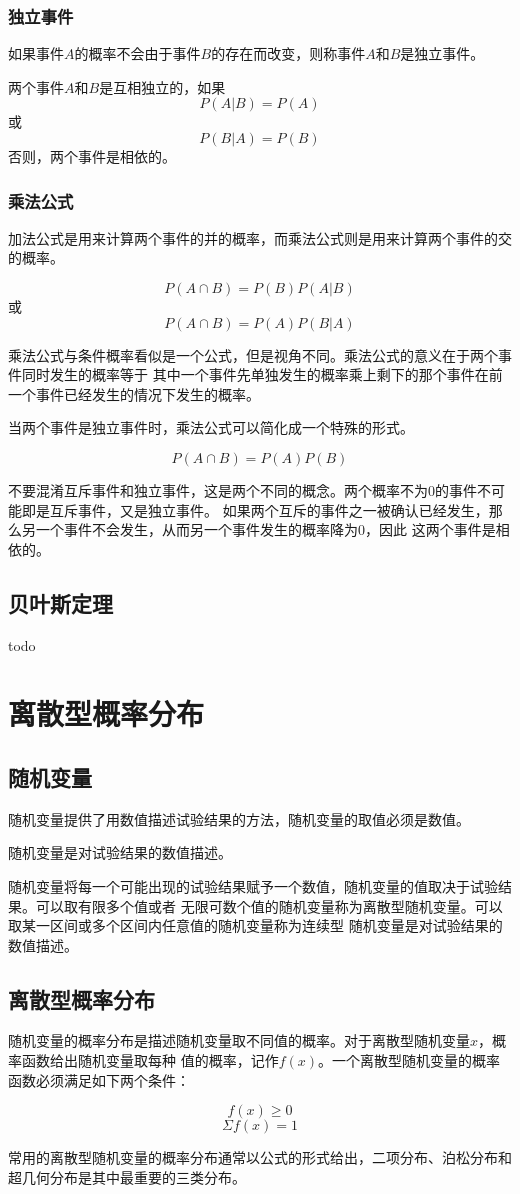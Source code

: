 \documentclass[a4paper]{ctexrep}
\begin{document}
\subsection{独立事件}
如果事件$A$的概率不会由于事件$B$的存在而改变，则称事件$A$和$B$是独立事件。
\begin{tcolorbox}[title = {独立事件}]
两个事件$A$和$B$是互相独立的，如果
\[P(A|B) = P(A)\]
或
\[P(B|A)=P(B)\]
否则，两个事件是相依的。
\end{tcolorbox}

\subsection{乘法公式}
加法公式是用来计算两个事件的并的概率，而乘法公式则是用来计算两个事件的交的概率。
\begin{tcolorbox}[title = {乘法公式}]
\[P(A\cap B) = P(B)P(A|B)\]
或
\[P(A\cap B) = P(A)P(B|A)\]
\end{tcolorbox}
乘法公式与条件概率看似是一个公式，但是视角不同。乘法公式的意义在于两个事件同时发生的概率等于
其中一个事件先单独发生的概率乘上剩下的那个事件在前一个事件已经发生的情况下发生的概率。

当两个事件是独立事件时，乘法公式可以简化成一个特殊的形式。
\begin{tcolorbox}[title = {独立事件的乘法公式}]
\[P(A\cap B) = P(A)P(B)\]
\end{tcolorbox}
不要混淆互斥事件和独立事件，这是两个不同的概念。两个概率不为0的事件不可能即是互斥事件，又是独立事件。
如果两个互斥的事件之一被确认已经发生，那么另一个事件不会发生，从而另一个事件发生的概率降为0，因此
这两个事件是相依的。

\section{贝叶斯定理}
todo


\chapter{离散型概率分布}


\section{随机变量}
随机变量提供了用数值描述试验结果的方法，随机变量的取值必须是数值。
\begin{tcolorbox}[title = {随机变量}]
随机变量是对试验结果的数值描述。
\end{tcolorbox}
随机变量将每一个可能出现的试验结果赋予一个数值，随机变量的值取决于试验结果。可以取有限多个值或者
无限可数个值的随机变量称为离散型随机变量。可以取某一区间或多个区间内任意值的随机变量称为连续型
随机变量是对试验结果的数值描述。

\section{离散型概率分布}
随机变量的概率分布是描述随机变量取不同值的概率。对于离散型随机变量$x$，概率函数给出随机变量取每种
值的概率，记作$f(x)$。一个离散型随机变量的概率函数必须满足如下两个条件：
\begin{tcolorbox}[title = {离散型概率函数的基本条件}]
\[f(x)\geqslant 0\]
\[\Sigma f(x) = 1\]
\end{tcolorbox}
常用的离散型随机变量的概率分布通常以公式的形式给出，二项分布、泊松分布和超几何分布是其中最重要的三类分布。
\end{document}

